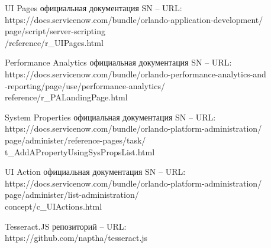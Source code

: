\documentclass[14pt]{mmcs_article}
\begin{document}
\begin{thebibliography}{0}
UI Pages официальная документация SN  – URL: \\https://docs.servicenow.com/bundle/orlando-application-development/\\page/script/server-scripting\\/reference/r\_UIPages.html

Performance Analytics официальная документация SN  – URL: \\https://docs.servicenow.com/bundle/orlando-performance-analytics-and\\-reporting/page/use/performance-analytics/\\reference/r\_PALandingPage.html

System Properties официальная документация SN  – URL: \\https://docs.servicenow.com/bundle/orlando-platform-administration/\\page/administer/reference-pages/task/\\t\_AddAPropertyUsingSysPropsList.html

UI Action официальная документация SN  – URL: \\https://docs.servicenow.com/bundle/orlando-platform-administration/\\page/administer/list-administration/\\concept/c\_UIActions.html





Tesseract.JS репозиторий – URL: \\https://github.com/naptha/tesseract.js





\end{thebibliography}
\end{document}
